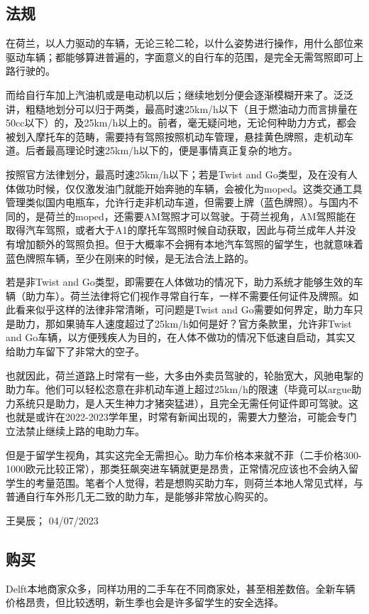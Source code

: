 \subsection{法规}
在荷兰，以人力驱动的车辆，无论三轮二轮，以什么姿势进行操作，用什么部位来驱动车辆；都能够算进普遍的，字面意义的自行车的范围，是完全无需驾照即可上路行驶的。

而给自行车加上汽油机或是电动机以后；继续地划分便会逐渐模糊开来了。泛泛讲，粗糙地划分可以归于两类，最高时速25km/h以下（且于燃油动力而言排量在50cc以下）的，及25km/h以上的。前者，毫无疑问地，无论何种助力方式，都会被划入摩托车的范畴，需要持有驾照按照机动车管理，悬挂黄色牌照，走机动车道。后者最高理论时速25km/h以下的，便是事情真正复杂的地方。

按照官方法律划分，最高时速25km/h以下；若是Twist and Go类型，及在没有人体做功时候，仅仅激发油门就能开始奔驰的车辆，会被化为moped。这类交通工具管理类似国内电瓶车，允许行走非机动车道，但需要上牌（蓝色牌照）。与国内不同的，是荷兰的moped，还需要AM驾照才可以驾驶。于荷兰视角，AM驾照能在取得汽车驾照，或者大于A1的摩托车驾照时候自动获取，因此与荷兰成年人并没有增加额外的驾照负担。但于大概率不会拥有本地汽车驾照的留学生，也就意味着蓝色牌照车辆，至少在刚来的时候，是无法合法上路的。

若是非Twist and Go类型，即需要在人体做功的情况下，助力系统才能够生效的车辆（助力车）。荷兰法律将它们视作寻常自行车，一样不需要任何证件及牌照。如此看来似乎这样的法律非常清晰，可问题是Twist and Go需要如何界定，助力车只是助力，那如果骑车人速度超过了25km/h如何是好？官方条款里，允许非Twist and Go车辆，以方便残疾人为目的，在人体不做功的情况下低速自启动，其实又给助力车留下了非常大的空子。

也就因此，荷兰道路上时常有一些，大多由外卖员驾驶的，轮胎宽大，风驰电掣的助力车。他们可以轻松恣意在非机动车道上超过25km/h的限速（毕竟可以argue助力系统只是助力，是人天生神力才猪突猛进），且完全无需任何证件即可驾驶。这也就是或许在2022-2023学年里，时常有新闻出现的，需要大力整治，可能会专门立法禁止继续上路的电助力车。

但是于留学生视角，其实这完全无需担心。助力车价格本来就不菲（二手价格300-1000欧元比较正常），那类狂飙突进车辆就更是昂贵，正常情况应该也不会纳入留学生的考量范围。笔者个人觉得，若是想购买助力车，则荷兰本地人常见式样，与普通自行车外形几无二致的助力车，是能够非常放心购买的。
\begin{flushright}
王昊辰； 04/07/2023
\end{flushright}

\subsection{购买}
Delft本地商家众多，同样功用的二手车在不同商家处，甚至相差数倍。全新车辆价格昂贵，但比较透明，新生季也会是许多留学生的安全选择。

